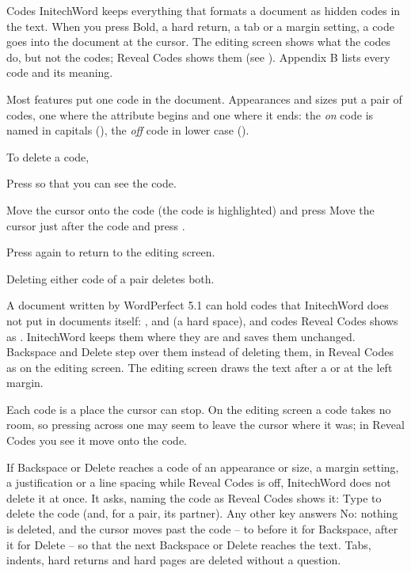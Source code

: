 \begin{Feature}{Codes}
InitechWord keeps everything that formats a document as hidden codes in the
text.  When you press Bold, a hard return, a tab or a margin setting, a code
goes into the document at the cursor.  The editing screen shows what the
codes do, but not the codes; Reveal Codes shows them (see ).  Appendix B lists every code and its meaning.

Most features put one code in the document.  Appearances and sizes put a
pair of codes, one where the attribute begins and one where it ends: the
\emph{on} code is named in capitals (\Code{[BOLD]}), the \emph{off} code in
lower case (\Code{[bold]}).

To delete a code,
\begin{WPSteps}
\item Press  so that you can see the code.
\item Move the cursor onto the code (the code is highlighted) and press
\Or
Move the cursor just after the code and press .
\item Press  again to return to the editing screen.
\end{WPSteps}
\begin{WPNote}Deleting either code of a pair deletes both.\end{WPNote}

\Notes
{}
A document written by WordPerfect 5.1 can hold codes that InitechWord does
not put in documents itself: \Code{[Center]},  and
\Code{[ ]} (a hard space), and codes Reveal Codes shows as \Code{[?]}.
InitechWord keeps them where they are and saves them unchanged.  Backspace
and Delete step over them instead of deleting them, in Reveal Codes as on
the editing screen.  The editing screen draws the text after a
\Code{[Center]} or  at the left margin.

Each code is a place the cursor can stop.  On the editing screen a code takes
no room, so pressing  across one may seem to leave the cursor where
it was; in Reveal Codes you see it move onto the code.

If Backspace or Delete reaches a code of an appearance or size, a margin
setting, a justification or a line spacing while Reveal Codes is off,
InitechWord does not delete it at once.  It asks, naming the code as Reveal
Codes shows it:
Type  to delete the code (and, for a pair, its partner).  Any other
key answers No: nothing is deleted, and the cursor moves past the code -- to
before it for Backspace, after it for Delete -- so that the next Backspace
or Delete reaches the text.  Tabs, indents, hard returns and hard pages are
deleted without a question.


\end{Feature}
